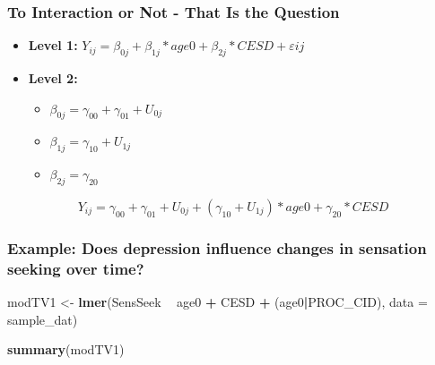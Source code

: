 \documentclass[]{article}
\newenvironment{Shaded}{\begin{snugshade}}{\end{snugshade}}
\newcommand{\KeywordTok}[1]{\textcolor[rgb]{0.13,0.29,0.53}{\textbf{#1}}}
\newcommand{\DataTypeTok}[1]{\textcolor[rgb]{0.13,0.29,0.53}{#1}}
\newcommand{\StringTok}[1]{\textcolor[rgb]{0.31,0.60,0.02}{#1}}
\newcommand{\OperatorTok}[1]{\textcolor[rgb]{0.81,0.36,0.00}{\textbf{#1}}}
\newcommand{\NormalTok}[1]{#1}
\begin{document}
\subsubsection{To Interaction or Not - That Is the
Question}\label{to-interaction-or-not---that-is-the-question}

\begin{itemize}
  \item \textbf{Level 1:} $Y_{ij} = \beta_{0j} + \beta_{1j}*age0 + \beta_{2j}*CESD + \varepsilon{ij}$
  \item \textbf{Level 2:} 
    \begin{itemize} 
      \item $\beta_{0j} = \gamma_{00} + \gamma_{01} + U_{0j}$
      \item $\beta_{1j} = \gamma_{10} + U_{1j}$
      \item $\beta_{2j} = \gamma_{20}$
    \end{itemize}
\end{itemize}

\[Y_{ij} =  \gamma_{00} + \gamma_{01} + U_{0j} + (\gamma_{10} + U_{1j})*age0 + \gamma_{20}*CESD\]

\subsubsection{Example: Does depression influence changes in sensation
seeking over
time?}\label{example-does-depression-influence-changes-in-sensation-seeking-over-time}

\small

\begin{Shaded}
\begin{Highlighting}[]
\NormalTok{modTV1 <-}\StringTok{ }\KeywordTok{lmer}\NormalTok{(SensSeek }\OperatorTok{~}\StringTok{ }\NormalTok{age0 }\OperatorTok{+}\StringTok{ }\NormalTok{CESD }\OperatorTok{+}\StringTok{ }\NormalTok{(age0}\OperatorTok{|}\NormalTok{PROC_CID), }\DataTypeTok{data =}\NormalTok{ sample_dat)}
\end{Highlighting}
\end{Shaded}

\small

\begin{Shaded}
\begin{Highlighting}[]
\KeywordTok{summary}\NormalTok{(modTV1)}
\end{Highlighting}
\end{Shaded}
\end{document}
